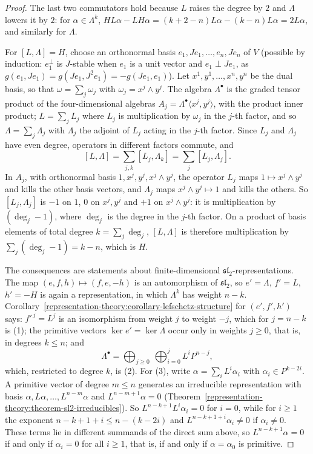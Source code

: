 \begin{proof}
The last two commutators hold because $L$ raises the degree by $2$ and $\Lambda$ lowers it by $2$: for $\alpha \in \Lambda^k$,
$HL\alpha - LH\alpha = (k + 2 - n)L\alpha - (k - n)L\alpha = 2L\alpha$, and similarly for $\Lambda$.

For $[L, \Lambda] = H$, choose an orthonormal basis $e_1, Je_1, \ldots, e_n, Je_n$ of $V$ (possible by induction: $e_1^\perp$ is
$J$-stable when $e_1$ is a unit vector and $e_1 \perp Je_1$, as $g(e_1, Je_1) = g(Je_1, J^2e_1) = -g(Je_1, e_1)$). Let
$x^1, y^1, \ldots, x^n, y^n$ be the dual basis, so that $\omega = \sum_j\omega_j$ with $\omega_j = x^j \wedge y^j$. The algebra
$\Lambda^\bullet$ is the graded tensor product of the four-dimensional algebras $A_j = \Lambda^\bullet\langle x^j, y^j\rangle$, with the
product inner product; $L = \sum_jL_j$ where $L_j$ is multiplication by $\omega_j$ in the $j$-th factor, and so $\Lambda = \sum_j\Lambda_j$
with $\Lambda_j$ the adjoint of $L_j$ acting in the $j$-th factor. Since $L_j$ and $\Lambda_j$ have even degree, operators in different
factors commute, and
\[
[L, \Lambda] = \sum_{j,k}[L_j, \Lambda_k] = \sum_j[L_j, \Lambda_j].
\]
In $A_j$, with orthonormal basis $1, x^j, y^j, x^j \wedge y^j$, the operator $L_j$ maps $1 \mapsto x^j \wedge y^j$ and kills the other basis
vectors, and $\Lambda_j$ maps $x^j \wedge y^j \mapsto 1$ and kills the others. So $[L_j, \Lambda_j]$ is $-1$ on $1$, $0$ on $x^j, y^j$ and
$+1$ on $x^j \wedge y^j$: it is multiplication by $(\deg_j - 1)$, where $\deg_j$ is the degree in the $j$-th factor. On a product of basis
elements of total degree $k = \sum_j\deg_j$, $[L, \Lambda]$ is therefore multiplication by $\sum_j(\deg_j - 1) = k - n$, which is $H$.

The consequences are statements about finite-dimensional $\mathfrak{sl}_2$-representations. The map $(e, f, h) \mapsto (f, e, -h)$ is an
automorphism of $\mathfrak{sl}_2$, so $e' = \Lambda$, $f' = L$, $h' = -H$ is again a representation, in which $\Lambda^k$ has weight $n - k$.
Corollary~\ref{representation-theory:corollary-lefschetz-structure} for $(e', f', h')$ says: $f'^{\,j} = L^j$ is an isomorphism from weight
$j$ to weight $-j$, which for $j = n - k$ is (1); the primitive vectors $\ker e' = \ker\Lambda$ occur only in weights $j \geq 0$, that is, in
degrees $k \leq n$; and
\[
\Lambda^\bullet = \bigoplus_{j \geq 0}\ \bigoplus_{i=0}^{j}L^iP^{n-j},
\]
which, restricted to degree $k$, is (2). For (3), write $\alpha = \sum_iL^i\alpha_i$ with $\alpha_i \in P^{k-2i}$. A primitive vector of
degree $m \leq n$ generates an irreducible representation with basis $\alpha, L\alpha, \ldots, L^{n-m}\alpha$ and $L^{n-m+1}\alpha = 0$
(Theorem~\ref{representation-theory:theorem-sl2-irreducibles}). So $L^{n-k+1}L^i\alpha_i = 0$ for $i = 0$, while for $i \geq 1$ the exponent
$n - k + 1 + i \leq n - (k - 2i)$ and $L^{n-k+1+i}\alpha_i \neq 0$ if $\alpha_i \neq 0$. These terms lie in different summands of the direct
sum above, so $L^{n-k+1}\alpha = 0$ if and only if $\alpha_i = 0$ for all $i \geq 1$, that is, if and only if $\alpha = \alpha_0$ is primitive.


\end{proof}
